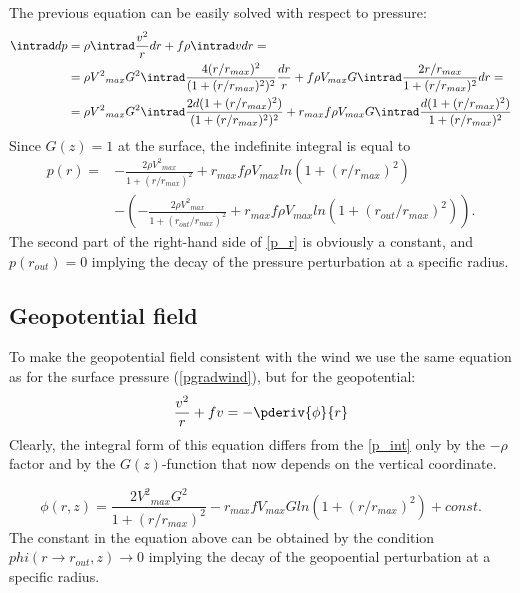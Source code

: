 The previous equation can be easily solved with respect to pressure:
\begin{align}
\intrad dp&=\rho\intrad\frac{v^2}{r}dr+f\rho\intrad vdr= \nonumber\\
&=\rho{V^2}_{max}G^2\intrad\frac{4(r/r_{max})^2}{(1+(r/r_{max})^2)^2}\frac{dr}{r}+f\rho V_{max}G\intrad\frac{2r/r_{max}}{1+(r/r_{max})^2}dr=\nonumber\\
&=\rho{V^2}_{max}G^2\intrad\frac{2d(1+(r/r_{max})^2)}{(1+(r/r_{max})^2)^2}+r_{max}f\rho V_{max}G\intrad\frac{d(1+(r/r_{max})^2)}{1+(r/r_{max})^2}\label{p_int}
\end{align}
Since $G(z)=1$ at the surface, the indefinite integral is equal to
\begin{align}
p(r)=&-\frac{2\rho{V^2}_{max}}{1+(r/r_{max})^2}+r_{max}f\rho V_{max}ln(1+(r/r_{max})^2) \nonumber\\
&-\left(-\frac{2\rho{V^2}_{max}}{1+(r_{out}/r_{max})^2}+r_{max}f\rho V_{max}ln(1+(r_{out}/r_{max})^2)\right). \label{p_r}
\end{align}
The second part of the right-hand side of \ref{p_r} is obviously a constant, and $p(r_{out})=0$ implying the decay of the pressure perturbation at a specific radius.

\subsection{Geopotential field}
To make the geopotential field consistent with the wind we use the same equation as for the surface pressure (\ref{pgradwind}), but for the geopotential:
\begin{equation}
\frac{v^2}{r}+fv=-\pderiv{\phi}{r} \label{phigradwind}
\end{equation}
Clearly, the integral form of this equation differs from the \ref{p_int} only by the $-\rho$ factor and by the $G(z)$-function that now depends on the vertical coordinate.

\begin{equation}
\phi(r,z)=\frac{2{V^2}_{max}G^2}{1+(r/r_{max})^2}-r_{max}fV_{max}Gln(1+(r/r_{max})^2)+const. \label{phi_r}
\end{equation}
The constant in the equation above can be obtained by the condition $phi(r\rightarrow r_{out},z)\rightarrow 0$ implying the decay of the geopoential perturbation at a specific radius.

